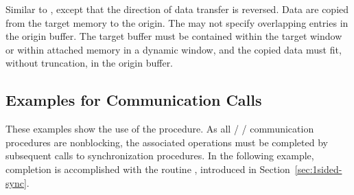 Similar to , except that the direction of data
transfer is reversed.  Data are copied from the target memory to the origin.
The  may not specify overlapping entries in
the origin buffer.
The target buffer must be contained within the target window
or within attached memory in a dynamic window, and the
copied data must fit, without truncation,
in the origin buffer. 

\subsection{Examples for Communication Calls}
\label{sec:1sided-example}

These examples show the use of the  procedure.
  As all \MPI/ \RMA/ communication procedures are nonblocking, the associated operations
  must be completed by subsequent calls to synchronization procedures.
  In the following example, completion is accomplished with the
  routine , introduced in
  Section~\ref{sec:1sided-sync}.

